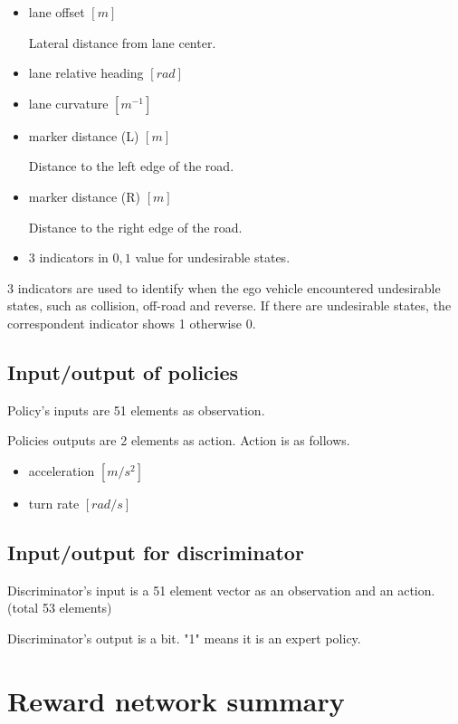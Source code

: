 \begin{itemize}
\item lane offset $[m]$

Lateral distance from lane center.

\item lane relative heading $[rad]$
\item lane curvature $[m^{-1}]$
\item marker distance (L) $[m]$

Distance to the left edge of the road.

\item marker distance (R) $[m]$

Distance to the right edge of the road.

\item 3 indicators in ${0, 1}$ value for undesirable  states.
\end{itemize}

3 indicators are used to identify when the ego vehicle encountered undesirable states, such as collision, off-road and reverse.
If there are undesirable states, the correspondent  indicator shows 1 otherwise 0.





\subsection{Input/output of policies}

Policy's inputs are 51 elements as observation.

Policies outputs are 2 elements as action.
Action is as follows.

\begin{itemize}
\item acceleration $[m/s^2]$
\item turn rate $[rad/s]$
\end{itemize}


\subsection{Input/output for discriminator}

Discriminator's input is a 51 element vector as an observation and an action. (total 53 elements)

Discriminator's output is a bit. "1" means it is an expert policy.





\section{Reward network summary}

